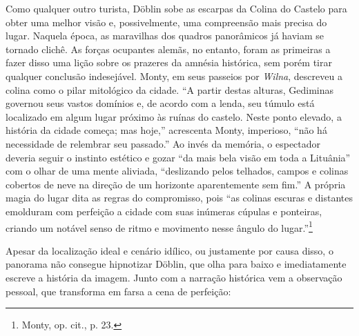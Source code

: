 Como qualquer outro turista, Döblin sobe as escarpas da Colina do
Castelo para obter uma melhor visão e, possivelmente, uma compreensão
mais precisa do lugar. Naquela época, as maravilhas dos quadros
panorâmicos já haviam se tornado clichê. As forças ocupantes alemãs, no
entanto, foram as primeiras a fazer disso uma lição sobre os prazeres da
amnésia histórica, sem porém tirar qualquer conclusão indesejável.
Monty, em seus passeios por \textit{Wilna}, descreveu a colina como o pilar
mitológico da cidade. ``A partir destas alturas, Gediminas 
governou seus vastos domínios e, de acordo com a lenda, seu túmulo está
localizado em algum lugar próximo às ruínas do castelo. Neste ponto
elevado, a história da cidade começa; mas hoje,'' acrescenta Monty,
imperioso, ``não há necessidade de relembrar seu passado.'' Ao invés da
memória, o espectador deveria seguir o instinto estético e gozar ``da
mais bela visão em toda a Lituânia'' com o olhar de uma mente aliviada,
``deslizando pelos telhados, campos e colinas cobertos de neve na
direção de um horizonte aparentemente sem fim.'' A própria magia do
lugar dita as regras do compromisso, pois ``as colinas escuras e
distantes emolduram com perfeição a cidade com suas inúmeras cúpulas e
ponteiras, criando um notável senso de ritmo e movimento nesse ângulo do
lugar.''\footnote{Monty, op. cit., p. 23.}

Apesar da localização ideal e cenário idílico, ou justamente por causa
disso, o panorama não consegue hipnotizar Döblin, que olha para baixo e
imediatamente escreve a história da imagem. Junto com a narração
histórica vem a observação pessoal, que transforma em farsa a cena de
perfeição:

